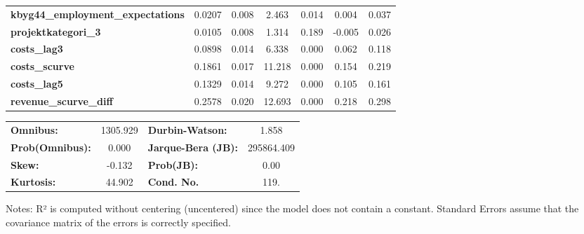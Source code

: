 \begin{center}
\begin{tabular}{lcccccc}
\textbf{kbyg44\_employment\_expectations} &       0.0207  &        0.008     &     2.463  &         0.014        &        0.004    &        0.037     \\
\textbf{projektkategori\_3}               &       0.0105  &        0.008     &     1.314  &         0.189        &       -0.005    &        0.026     \\
\textbf{costs\_lag3}                      &       0.0898  &        0.014     &     6.338  &         0.000        &        0.062    &        0.118     \\
\textbf{costs\_scurve}                    &       0.1861  &        0.017     &    11.218  &         0.000        &        0.154    &        0.219     \\
\textbf{costs\_lag5}                      &       0.1329  &        0.014     &     9.272  &         0.000        &        0.105    &        0.161     \\
\textbf{revenue\_scurve\_diff}            &       0.2578  &        0.020     &    12.693  &         0.000        &        0.218    &        0.298     \\
\bottomrule
\end{tabular}
\begin{tabular}{lclc}
\textbf{Omnibus:}       & 1305.929 & \textbf{  Durbin-Watson:     } &     1.858   \\
\textbf{Prob(Omnibus):} &   0.000  & \textbf{  Jarque-Bera (JB):  } & 295864.409  \\
\textbf{Skew:}          &  -0.132  & \textbf{  Prob(JB):          } &      0.00   \\
\textbf{Kurtosis:}      &  44.902  & \textbf{  Cond. No.          } &      119.   \\
\bottomrule
\end{tabular}
\end{center}

Notes: \newline
 [1] R² is computed without centering (uncentered) since the model does not contain a constant. \newline
 [2] Standard Errors assume that the covariance matrix of the errors is correctly specified.